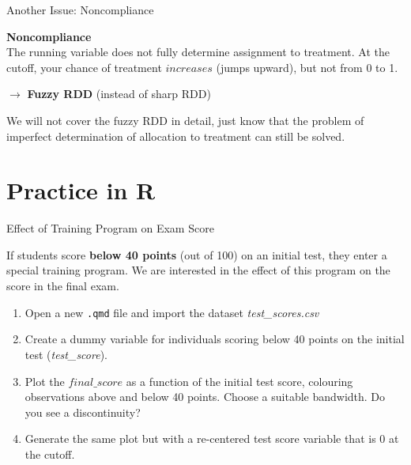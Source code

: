 \documentclass[11pt, aspectratio = 169]{beamer}
\begin{document}
			
			\begin{frame}{Another Issue: Noncompliance}
				
				\textbf{Noncompliance} \\
				The running variable does not fully determine assignment to treatment. At the cutoff, your chance of treatment $increases$ (jumps upward), but not from 0 to 1.
				
				$\rightarrow$ \textbf{Fuzzy RDD} (instead of sharp RDD)
				
				We will not cover the fuzzy RDD in detail, just know that the problem of imperfect determination of allocation to treatment can still be solved.
			\end{frame}
		
	\section{Practice in R}
			
			\begin{frame}{Effect of Training Program on Exam Score}
				
				If students score \textbf{below 40 points} (out of 100) on an initial test, they enter a special training program. We are interested in the effect of this program on the score in the final exam. 
				
				\begin{enumerate}
					\item  Open a new \texttt{.qmd} file and import the dataset \textit{test\_scores.csv}
					\item  Create a dummy variable for individuals scoring below 40 points on the initial test (\textit{test\_score}).
					\item  Plot the $final\_score$ as a function of the initial test score, colouring observations above and below 40 points. Choose a suitable bandwidth. Do you see a discontinuity?
					\item  Generate the same plot but with a re-centered test score variable that is 0 at the cutoff.
						\end{enumerate}
			\end{frame}
			
\end{document}
